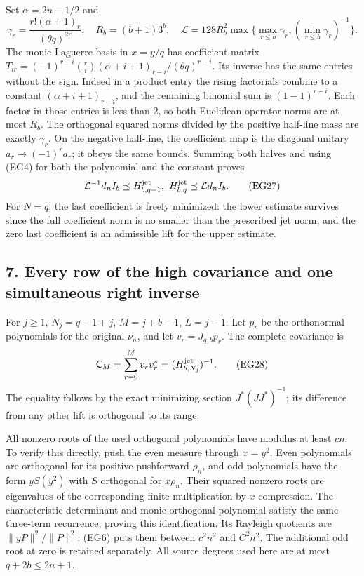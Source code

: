 \documentclass[10pt]{article}
\begin{document}
Set \(\alpha=2n-1/2\) and \[
 \gamma_r=\frac{r!(\alpha+1)_r}{(\theta q)^{2r}},\quad
 R_b=(b+1)3^b,\quad
 \mathcal L=128R_b^2\max\{\max_{r\le b}\gamma_r,
 (\min_{r\le b}\gamma_r)^{-1}\}.
 \tag{EG26}
\] The monic Laguerre basis in \(x=y/q\) has coefficient matrix \(T_{ir}=(-1)^{r-i}\binom ri(\alpha+i+1)_{r-i}/(\theta q)^{r-i}\). Its inverse has the same entries without the sign. Indeed in a product entry the rising factorials combine to a constant \((\alpha+i+1)_{r-i}\), and the remaining binomial sum is \((1-1)^{r-i}\). Each factor in those entries is less than 2, so both Euclidean operator norms are at most \(R_b\). The orthogonal squared norms divided by the positive half-line mass are exactly \(\gamma_r\). On the negative half-line, the coefficient map is the diagonal unitary \(a_r\mapsto(-1)^ra_r\); it obeys the same bounds. Summing both halves and using (EG4) for both the polynomial and the constant proves \[
 \mathcal L^{-1}d_nI_b\preceq H^{\rm jet}_{b,q-1},\ H^{\rm jet}_{b,q}
 \preceq\mathcal Ld_nI_b.
 \tag{EG27}
\] For \(N=q\), the last coefficient is freely minimized: the lower estimate survives since the full coefficient norm is no smaller than the prescribed jet norm, and the zero last coefficient is an admissible lift for the upper estimate.

\subsection{7. Every row of the high covariance and one simultaneous right inverse}\label{every-row-of-the-high-covariance-and-one-simultaneous-right-inverse}

For \(j\ge1\), \(N_j=q-1+j\), \(M=j+b-1\), \(L=j-1\). Let \(p_r\) be the orthonormal polynomials for the original \(\nu_n\), and let \(v_r=J_{q,b}p_r\). The complete covariance is \[
 \mathsf C_M=\sum_{r=0}^M v_rv_r^*=(H^{\rm jet}_{b,N_j})^{-1}.
 \tag{EG28}
\] The equality follows by the exact minimizing section \(J^*(JJ^*)^{-1}\); its difference from any other lift is orthogonal to its range.

All nonzero roots of the used orthogonal polynomials have modulus at least \(cn\). To verify this directly, push the even measure through \(x=y^2\). Even polynomials are orthogonal for its positive pushforward \(\rho_n\), and odd polynomials have the form \(yS(y^2)\) with \(S\) orthogonal for \(x\rho_n\). Their squared nonzero roots are eigenvalues of the corresponding finite multiplication-by-\(x\) compression. The characteristic determinant and monic orthogonal polynomial satisfy the same three-term recurrence, proving this identification. Its Rayleigh quotients are \(\|yP\|^2/\|P\|^2\); (EG6) puts them between \(c^2n^2\) and \(C^2n^2\). The additional odd root at zero is retained separately. All source degrees used here are at most \(q+2b\le2n+1\).
\end{document}
